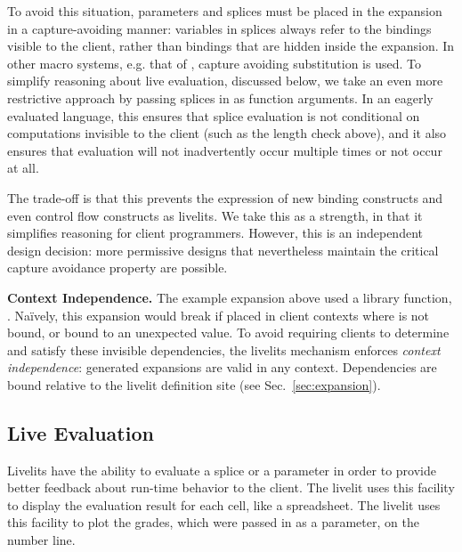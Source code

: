 To avoid this situation, parameters and splices must be placed in the expansion
in a capture-avoiding manner: variables in splices
always refer to the bindings visible to the client,
rather than bindings that are hidden inside the expansion.
In other macro systems, e.g. that of \citet{TLMs}, 
capture avoiding substitution is used. 
To simplify reasoning about live evaluation, discussed below, we take 
an even more restrictive approach by passing splices in as function 
arguments. In an eagerly evaluated language, this ensures that 
splice evaluation is not conditional on computations invisible to the 
client (such as the length check above), 
and it also ensures that evaluation will not inadvertently 
occur multiple times or not occur at all. 

The trade-off is that this prevents the expression of new 
binding constructs and even control flow constructs as livelits.
We take this as a strength, in that it simplifies 
reasoning for client programmers. However, this is an independent 
design decision: 
more permissive designs that nevertheless 
maintain the critical capture avoidance property are possible.



\textbf{Context Independence.}
The example expansion above used a library function, .
Na\"ively, this expansion would break if placed
in client contexts where  is not bound, or bound to
an unexpected value.
To avoid requiring clients to determine and satisfy these invisible
dependencies, the livelits mechanism enforces \emph{context independence}:
generated expansions are valid in any context. Dependencies are bound
relative to the livelit definition site (see Sec.~\ref{sec:expansion}).

\subsection{Live Evaluation}\label{sec:live-evaluation}
Livelits have the ability to evaluate a splice or a parameter
in order to provide better feedback about run-time behavior to the client.
The  livelit uses this facility to display
the evaluation result for each cell, like a spreadsheet.
The  livelit uses this facility to plot the grades, which were
passed in as a parameter, on the number line.

